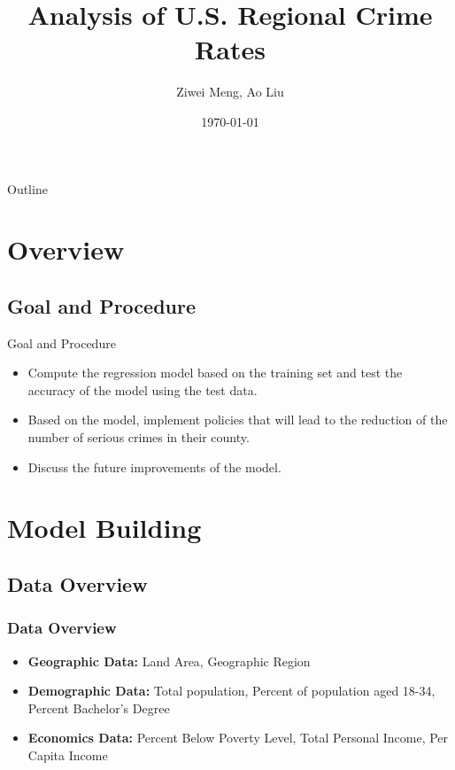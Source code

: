 \documentclass{beamer}
\title[Columbia University]{Analysis of U.S. Regional Crime Rates}
\author{Ziwei Meng, Ao Liu}
\date{\today}
\begin{document}
\begin{frame}
  \titlepage
\end{frame}

\begin{frame}{Outline}
  \tableofcontents
\end{frame}

\section{Overview}
\subsection{Goal and Procedure}
\begin{frame}{Goal and Procedure}
\begin{itemize}
\item Compute the regression model based on the training set and test the accuracy of the model using the test data.
\item Based on the model, implement policies that will lead to the reduction of the number of serious crimes in their county.
\item Discuss the future improvements of the model.
\end{itemize}
\end{frame}


\section{Model Building}
\subsection{Data Overview}
\begin{frame}[fragile]
\frametitle{Data Overview}
\begin{itemize}
\item \textbf{Geographic Data:} Land Area, Geographic Region
\item \textbf{Demographic Data:} Total population, Percent of population aged 18-34, Percent Bachelor’s Degree
\item \textbf{Economics Data:} Percent Below Poverty Level, Total Personal Income, Per Capita Income
\end{itemize}
\end{frame}
\end{document}

